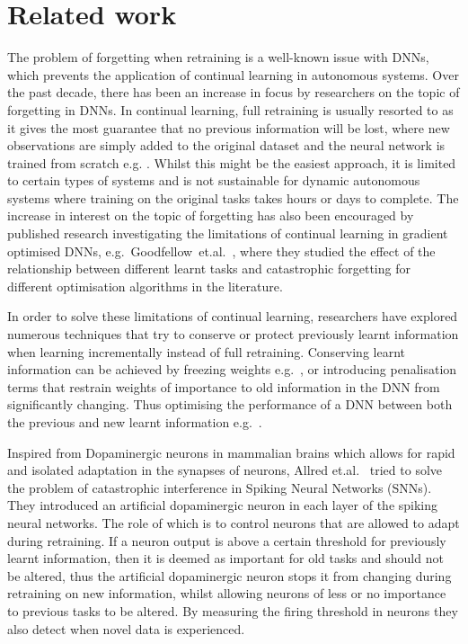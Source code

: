 \section{Related work}

The problem of forgetting when retraining is a well-known issue with DNNs, which prevents the application of continual learning in autonomous systems.
%
Over the past decade, there has been an increase in focus by researchers on the topic of forgetting in DNNs. 
%
In continual learning, full retraining is usually resorted to as it gives the most guarantee that no previous information will be lost, where new observations are simply added to the original dataset and the neural network is trained from scratch e.g. \cite{Stocco2021}. 
%
Whilst this might be the easiest approach, it is limited to certain types of systems and is not sustainable for dynamic autonomous systems where training on the original tasks takes hours or days to complete.
%
The increase in interest on the topic of forgetting has also been encouraged by published research investigating the limitations of continual learning in gradient optimised DNNs, e.g.~Goodfellow~et.al.~\cite{Goodfellow2014}, where they studied the effect of the relationship between different learnt tasks and catastrophic forgetting for different optimisation algorithms in the literature. 

In order to solve these limitations of continual learning, researchers have explored numerous techniques that try to conserve or protect previously learnt information when learning incrementally instead of full retraining.
%
Conserving learnt information can be achieved by freezing weights e.g.~\cite{Wang2017,Li2018c}, or introducing penalisation terms that 
restrain weights of importance to old information in the DNN from significantly changing. 
%
Thus optimising the performance of a DNN between both the previous and new learnt information e.g.~\cite{Kirkpatrick2017,Zenke2017,Maltoni2019a}.

Inspired from Dopaminergic neurons in mammalian brains which allows for rapid and isolated adaptation in the synapses of neurons, Allred et.al.~\cite{Allred2020} tried to solve the problem of catastrophic interference in Spiking Neural Networks (SNNs).
%
They introduced an artificial dopaminergic neuron in each layer of the spiking neural networks. The role of which is to control neurons that are allowed to adapt during retraining. 
%
If a neuron output is above a certain threshold for previously learnt information, then it is deemed as important for old tasks and should not be altered, thus the artificial dopaminergic neuron stops it from changing during retraining on new information, whilst allowing neurons of less or no importance to previous tasks to be altered.
%
By measuring the firing threshold in neurons they also detect when novel data is experienced.

